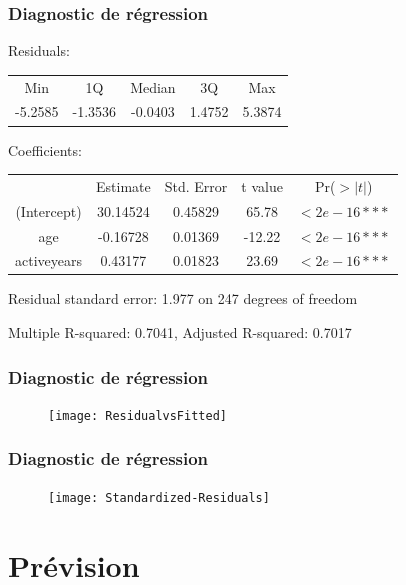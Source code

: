 \begin{frame}
\frametitle{Diagnostic de régression}

Residuals:
\begin{tabular}{ccccc}
    Min   &   1Q     & Median  &    3Q  &   Max \\
-5.2585   &  -1.3536 & -0.0403 & 1.4752 &  5.3874 \\
\end{tabular}

Coefficients:
\begin{tabular}{ccccc}
                 & Estimate &Std. Error &t value& Pr($>|t|$) \\
(Intercept)      & 30.14524 &   0.45829 &  65.78&   $<2e-16 ***$ \\
age              &-0.16728  &  0.01369  &-12.22 &   $<2e-16 ***$ \\
activeyears      &0.43177   & 0.01823   &23.69  &   $<2e-16 ***$  \\
\end{tabular}

Residual standard error: 1.977 on 247 degrees of freedom

Multiple R-squared:  0.7041,	Adjusted R-squared:  0.7017

\end{frame}




\begin{frame}
\frametitle{Diagnostic de régression}
\begin{figure}
  \centering
  \texttt{[image: ResidualvsFitted]}\\
\end{figure}
\end{frame}


\begin{frame}
\frametitle{Diagnostic de régression}
\begin{figure}
  \centering
  \texttt{[image: Standardized-Residuals]}\\
\end{figure}
\end{frame}












\section{Prévision}

